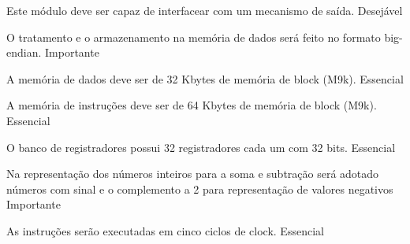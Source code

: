 \begin{nonfunctional}
	  	
	  {Este módulo deve ser capaz de interfacear com um mecanismo de saída.}
	  {Desejável}
	  
        {O tratamento e o armazenamento na memória de dados será feito no formato big-endian.}
        {Importante}
        
        {A memória de dados deve ser de 32 Kbytes de memória de block (M9k).}
        {Essencial}
        
        {A memória de instruções deve ser de 64 Kbytes de memória de block (M9k).}
        {Essencial}
        
        {O banco de registradores possui 32 registradores cada um com 32 bits.}
        {Essencial}
	  
		{Na representação dos números inteiros para a soma e subtração será adotado números com sinal e o complemento a 2 para representação de valores negativos}
		{Importante}
		
		{As instruções serão executadas em cinco ciclos de clock.}
		{Essencial}		
			  
	  \end{nonfunctional}